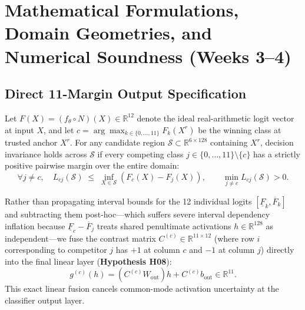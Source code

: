 \documentclass[11pt,a4paper]{article}
\newcommand{\R}{\mathbb{R}}
\newcommand{\Sset}{\mathcal{S}}
\theoremstyle{remark}
\begin{document}
\section{Mathematical Formulations, Domain Geometries, and Numerical Soundness (Weeks 3--4)}

\subsection{Direct 11-Margin Output Specification}
Let $F(X) = (f_\theta \circ N)(X) \in \R^{12}$ denote the ideal real-arithmetic logit vector at input $X$, and let $c = \arg\max_{k \in \{0,\dots,11\}} F_k(X^r)$ be the winning class at trusted anchor $X^r$. For any candidate region $\Sset \subset \R^{6 \times 128}$ containing $X^r$, decision invariance holds across $\Sset$ if every competing class $j \in \{0,\dots,11\} \setminus \{c\}$ has a strictly positive pairwise margin over the entire domain:
\begin{equation}
  \forall j \neq c, \quad L_{cj}(\Sset) \;\le\; \inf_{X \in \Sset} \left( F_c(X) - F_j(X) \right), \qquad \min_{j \neq c} L_{cj}(\Sset) > 0.
\end{equation}

Rather than propagating interval bounds for the 12 individual logits $[\underline{F}_k, \overline{F}_k]$ and subtracting them post-hoc---which suffers severe interval dependency inflation because $\underline{F}_c - \overline{F}_j$ treats shared penultimate activations $h \in \R^{128}$ as independent---we fuse the contrast matrix $C^{(c)} \in \R^{11 \times 12}$ (where row $i$ corresponding to competitor $j$ has $+1$ at column $c$ and $-1$ at column $j$) directly into the final linear layer (\textbf{Hypothesis H08}):
\begin{equation}
  g^{(c)}(h) = \left( C^{(c)} W_{\text{out}} \right) h + C^{(c)} b_{\text{out}} \in \R^{11}.
\end{equation}
This exact linear fusion cancels common-mode activation uncertainty at the classifier output layer.
\end{document}
